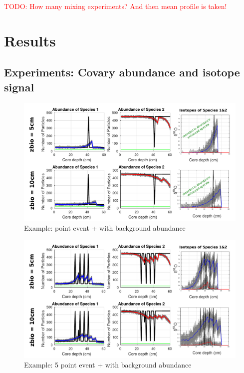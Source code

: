 \documentclass[a4paper,oneside,9pt]{article}
\begin{document}
\textcolor{red}{TODO: How many mixing experiments? And then mean profile is taken!}

\section{Results}\label{Results} %
\subsection{Experiments: Covary abundance and isotope signal}

\begin{figure}[hbp]
\begin{center}
	\includegraphics[width=1.0\textwidth]{../figures/1point_event_5+10cm_background.pdf}
	\caption{Example: point event + with background abundance}\label{fig:1pointevent}
\end{center}
\end{figure}


\begin{figure}[hbp]
\begin{center}
	\includegraphics[width=1.0\textwidth]{../figures/../figures/5point_event_5+10cm_background.pdf}
	\caption{Example: 5 point event + with background abundance}\label{fig:5pointevent}
\end{center}
\end{figure}
\end{document}
